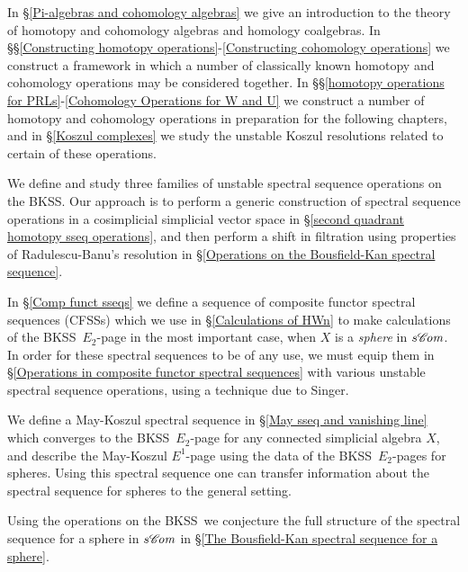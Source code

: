 \documentclass[11pt]{amsart} \renewcommand{\baselinestretch}{1.2}
\theoremstyle{plain}
\numberwithin{equation}{section} %
\theoremstyle{plain}
\numberwithin{equation}{chapter} %
\newcommand{\scrC}{\mathscr{C}}
\newcommand{\algs}{{\scrC\!\textit{\normalfont\textit{om}}}}
\newcommand{\BKSS}{BKSS}
\newcommand{\CFSSs}{CFSSs}
\begin{document}
\begin{Introduction}
In \S\ref{Pi-algebras and cohomology algebras} we give an introduction to the theory of homotopy and cohomology algebras and homology coalgebras. In \S\S\ref{Constructing homotopy operations}-\ref{Constructing cohomology operations} %
we construct a framework in which a number of classically known homotopy and cohomology operations may be considered together. In \S\S\ref{homotopy operations for PRLs}-\ref{Cohomology Operations for W and U} we construct a number of homotopy and cohomology operations in preparation for the following chapters, and in \S\ref{Koszul complexes} we study the unstable Koszul resolutions related to certain of these operations.


We define and study three families of unstable spectral sequence operations on the \BKSS.  Our approach is to perform  a generic construction of spectral sequence operations in a cosimplicial simplicial vector space in \S\ref{second quadrant homotopy sseq operations}, and then perform a shift in filtration using properties of Radulescu-Banu's resolution in \S\ref{Operations on the Bousfield-Kan spectral sequence}.


In \S\ref{Comp funct sseqs} we define a sequence of composite functor spectral sequences (\CFSSs) which we use in \S\ref{Calculations of HWn} to make calculations of the \BKSS\ $E_2$-page in the most important case, when $X$ is a \emph{sphere} in $s\algs$. In order for these spectral sequences to be of any use, we must equip them in \S\ref{Operations in composite functor spectral sequences} with various unstable spectral sequence operations, using a technique due to Singer. 

We define a May-Koszul spectral sequence in \S\ref{May sseq and vanishing line} which converges to the \BKSS\ $E_2$-page for any connected simplicial algebra $X$, and describe the May-Koszul $E^1$-page using the data of the \BKSS\ $E_2$-pages for spheres. Using this spectral sequence one can transfer information about the spectral sequence for spheres to the general setting.

Using the operations on the \BKSS\ we conjecture the full structure of the spectral sequence for a sphere in $s\algs$ in \S\ref{The Bousfield-Kan spectral sequence for a sphere}. 






\end{Introduction}
\end{document}
